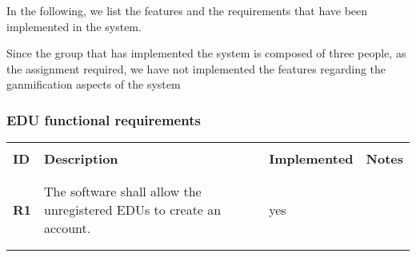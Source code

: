 In the following, we list the features and the requirements that have been implemented in the system.

Since the group that has implemented the system is composed of three people, as the assignment required, we have not implemented the features regarding the ganmification aspects of the system

\subsubsection*{EDU functional requirements}
\renewcommand{\arraystretch}{0.5}
\begin{longtable}[H]{l p{6.5cm} l p{3cm}}
    \hline
                 &                                                                                                                                                                                                                                                                          &                      &                                                                                         \\
    \textbf{ID}  & \textbf{Description}                                                                                                                                                                                                                                                     & \textbf{Implemented} & \textbf{Notes}                                                                          \\
                 &                                                                                                                                                                                                                                                                          &                      &                                                                                         \\\hline & & & \\
    \textbf{R1}  & The software shall allow the unregistered EDUs to create an account.                                                                                                                                                                                                     & {\color{green}yes}   &                                                                                         \\
                 &                                                                                                                                                                                                                                                                          &                      &                                                                                         \\\hline & & & \\

\end{longtable}
